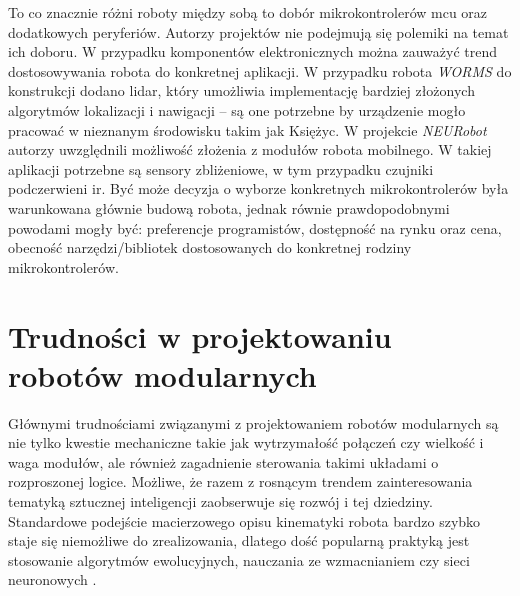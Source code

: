 To co znacznie różni roboty między sobą to dobór mikrokontrolerów \gls{mcu} oraz dodatkowych peryferiów. Autorzy projektów nie podejmują się polemiki na temat ich doboru. W przypadku komponentów elektronicznych można zauważyć trend dostosowywania robota do konkretnej aplikacji. W przypadku robota \textit{WORMS} do konstrukcji dodano \gls{lidar}, który umożliwia implementację bardziej złożonych algorytmów lokalizacji i nawigacji -- są one potrzebne by urządzenie mogło pracować w nieznanym środowisku takim jak Księżyc. W projekcie \textit{NEURobot} autorzy uwzględnili możliwość złożenia z modułów robota mobilnego. W takiej aplikacji potrzebne są sensory zbliżeniowe, w tym przypadku czujniki podczerwieni \gls{ir}. Być może decyzja o wyborze konkretnych mikrokontrolerów była warunkowana głównie budową robota, jednak równie prawdopodobnymi powodami mogły być: preferencje programistów, dostępność na rynku oraz cena, obecność narzędzi/bibliotek dostosowanych do konkretnej rodziny mikrokontrolerów.

\section{Trudności w projektowaniu robotów modularnych}
Głównymi trudnościami związanymi z projektowaniem robotów modularnych są nie tylko kwestie mechaniczne takie jak wytrzymałość połączeń czy wielkość i waga modułów, ale również zagadnienie sterowania takimi układami o rozproszonej logice. Możliwe, że razem z rosnącym trendem zainteresowania tematyką sztucznej inteligencji zaobserwuje się rozwój i tej dziedziny. Standardowe podejście macierzowego opisu kinematyki robota bardzo szybko staje się niemożliwe do zrealizowania, dlatego dość popularną praktyką jest stosowanie algorytmów ewolucyjnych, nauczania ze wzmacnianiem czy sieci neuronowych \cite{hossein2015, }. 